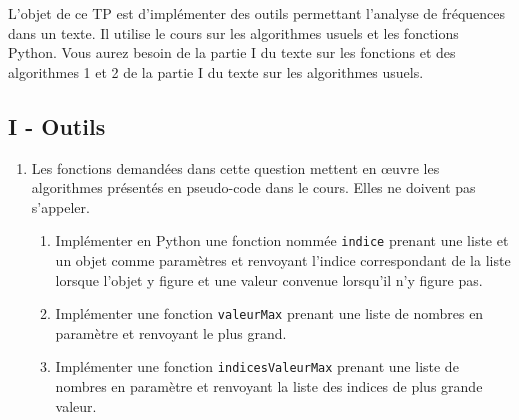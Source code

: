L'objet de ce TP est d'implémenter des outils permettant l'analyse de fréquences dans un texte.\newline
Il utilise le cours sur les algorithmes usuels et les fonctions Python. Vous aurez besoin de la partie I du texte sur les fonctions et des algorithmes 1 et 2 de la partie I du texte sur les algorithmes usuels. 

\subsection*{I - Outils}
\begin{enumerate}
  \item Les fonctions demandées dans cette question mettent en \oe{}uvre les algorithmes présentés en pseudo-code dans le cours. Elles ne doivent pas s'appeler.
\begin{enumerate}
  \item Implémenter en Python une fonction nommée \verb|indice| prenant une liste et un objet comme paramètres et renvoyant l'indice correspondant de la liste lorsque l'objet y figure et une valeur convenue lorsqu'il n'y figure pas.
  \item Implémenter une fonction \texttt{valeurMax} prenant une liste de nombres en paramètre et renvoyant le plus grand.
  \item Implémenter une fonction \texttt{indicesValeurMax} prenant une liste de nombres en paramètre et renvoyant la liste des indices de plus grande valeur.   
\end{enumerate}
   

\end{enumerate}

